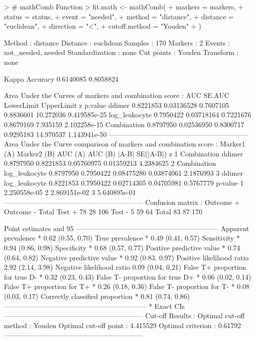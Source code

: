 \documentclass[10pt]{article}
\begin{document}
\begin{Schunk}
\begin{Sinput}
> # mathComb Function
> fit.math <- mathComb(
+   markers = markers,
+   status = status,
+   event = "needed",
+   method = "distance",
+   distance = "euclidean",
+   direction = "<",
+   cutoff.method = "Youden"
+ )
\end{Sinput}
\begin{Soutput}
Method : distance 
Distance : euclidean 
Samples : 170 
Markers : 2 
Events : not_needed, needed 
Standardization : none 
Cut points : Youden 
Transform : none 

 Kappa       Accuracy  
 0.6140085   0.8058824

Area Under the Curves of markers and combination score :  
                    AUC     SE.AUC LowerLimit UpperLimit         z      p.value
ddimer        0.8221853 0.03136528  0.7607105  0.8836601 10.272036 9.419585e-25
log_leukocyte 0.7950422 0.03718164  0.7221676  0.8679169  7.935159 2.102258e-15
Combination   0.8797950 0.02536950  0.8300717  0.9295183 14.970537 1.143941e-50
------------------------------------------------------------ 
Area Under the Curve comparison of markers and combination score :  
  Marker1 (A)   Marker2 (B)   AUC (A)   AUC (B)      |A-B|  SE(|A-B|)         z
1 Combination        ddimer 0.8797950 0.8221853 0.05760975 0.01359213 4.2384625
2 Combination log_leukocyte 0.8797950 0.7950422 0.08475280 0.03874061 2.1876993
3      ddimer log_leukocyte 0.8221853 0.7950422 0.02714305 0.04705981 0.5767779
       p-value
1 2.250558e-05
2 2.869151e-02
3 5.640895e-01
------------------------------------------------------------ 
Confusion matrix :  
          Outcome +    Outcome -      Total
Test +           78           28        106
Test -            5           59         64
Total            83           87        170

Point estimates and 95% CIs:
--------------------------------------------------------------
Apparent prevalence *                  0.62 (0.55, 0.70)
True prevalence *                      0.49 (0.41, 0.57)
Sensitivity *                          0.94 (0.86, 0.98)
Specificity *                          0.68 (0.57, 0.77)
Positive predictive value *            0.74 (0.64, 0.82)
Negative predictive value *            0.92 (0.83, 0.97)
Positive likelihood ratio              2.92 (2.14, 3.98)
Negative likelihood ratio              0.09 (0.04, 0.21)
False T+ proportion for true D- *      0.32 (0.23, 0.43)
False T- proportion for true D+ *      0.06 (0.02, 0.14)
False T+ proportion for T+ *           0.26 (0.18, 0.36)
False T- proportion for T- *           0.08 (0.03, 0.17)
Correctly classified proportion *      0.81 (0.74, 0.86)
--------------------------------------------------------------
* Exact CIs
------------------------------------------------------------ 
Cut-off Results : 
Optimal cut-off method : Youden 
Optimal cut-off point  : 4.415529 
Optimal criterion      : 0.61792 
------------------------------------------------------------ 
\end{Soutput}
\end{Schunk}
\end{document}
